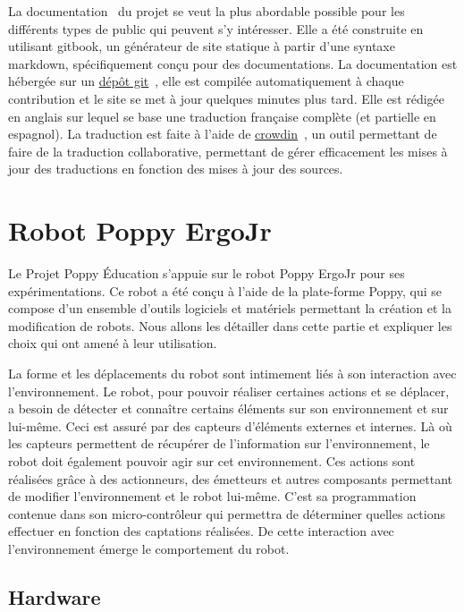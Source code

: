         La documentation~ du projet se veut la plus abordable possible pour les différents types de public qui peuvent s'y intéresser.
        Elle a été construite en utilisant gitbook, un générateur de site statique à partir d'une syntaxe markdown, spécifiquement conçu pour des documentations.
        La documentation est hébergée sur un \href{https://github.com/poppy-project/poppy-docs}{dépôt git}~, elle est compilée automatiquement à chaque contribution et le site se met à jour quelques minutes plus tard.
        Elle est rédigée en anglais sur lequel se base une traduction française complète (et partielle en espagnol). La  traduction est faite à l'aide de \href{https://crowdin.com/project/poppy-docs/fr}{crowdin}~, un outil permettant de faire de la traduction collaborative, permettant de gérer efficacement les mises à jour des traductions en fonction des mises à jour des sources.
\section{Robot Poppy ErgoJr}
    Le Projet Poppy Éducation s’appuie sur le robot Poppy ErgoJr pour ses expérimentations.
    Ce robot a été conçu à l'aide de la plate-forme Poppy, qui se compose d'un ensemble d’outils logiciels et matériels permettant la création et la modification de robots. Nous allons les détailler dans cette partie et expliquer les choix qui ont amené à leur utilisation.\par%
    La forme et les déplacements du robot sont intimement liés à son interaction avec l'environnement. Le robot, pour pouvoir réaliser certaines actions et se déplacer, a besoin de détecter et connaître certains éléments sur son environnement et sur lui-même. Ceci est assuré par des capteurs d'éléments externes et internes. Là où les capteurs permettent de récupérer de l'information sur l'environnement, le robot doit également pouvoir agir sur cet environnement. Ces actions sont réalisées grâce à des actionneurs, des émetteurs et autres composants permettant de modifier l'environnement et le robot lui-même.%
    C'est sa programmation contenue dans son micro-contrôleur qui permettra de déterminer quelles actions effectuer en fonction des captations réalisées. De cette interaction avec l'environnement émerge le comportement du robot.
    \subsection{Hardware}
